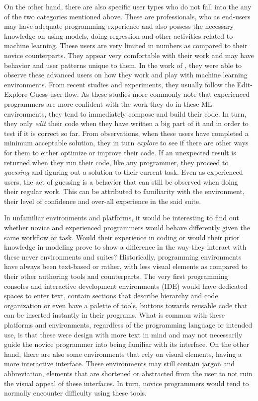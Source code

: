 \documentclass{sigchi}
\begin{document}
On the other hand, there are also specific user types who do not fall into the any of the two categories mentioned above. These are professionals, who as end-users may have adequate programming experience and also possess the necessary knowledge on using models, doing regression and other activities related to machine learning. These users are very limited in numbers as compared to their novice counterparts. They appear very comfortable with their work and may have behavior and user patterns unique to them. In the work of \cite{sarkar2015interactive}, they were able to observe these advanced users on how they work and play with machine learning environments. From recent studies and experiments, they usually follow the Edit-Explore-Guess user flow. As these studies more commonly note that experienced programmers are more confident with the work they do in these ML environments, they tend to immediately compose and build their code. In turn, they only \textit{edit} their code when they have written a big part of it and in order to test if it is correct so far. From observations, when these users have completed a minimum acceptable solution, they in turn \textit{explore} to see if there are other ways for them to either optimize or improve their code. If an unexpected result is returned when they run their code, like any programmer, they proceed to \textit{guessing} and figuring out a solution to their current task. Even as experienced users, the act of guessing is a behavior that can still be observed when doing their regular work. This can be attributed to familiarity with the environment, their level of confidence and over-all experience in the said suite. 

In unfamiliar environments and platforms, it would be interesting to find out whether novice and experienced programmers would behave differently given the same workflow or task. Would their experience in coding or would their prior knowledge in modeling prove to show a difference in the way they interact with these never environments and suites? Historically, programming environments have always been text-based or rather, with less visual elements as compared to their other authoring tools and counterparts. The very first programming consoles and interactive development environments (IDE) would have dedicated spaces to enter text, contain sections that describe hierarchy and code organization or even have a palette of tools, buttons towards reusable code that can be inserted instantly in their programs. What is common with these platforms and environments, regardless of the programming language or intended use, is that these were design with more text in mind and may not necessarily guide the novice programmer into being familiar with its interface. On the other hand, there are also some environments that rely on visual elements, having a more interactive interface. These environments may still contain jargon and abbreviation, elements that are shortened or abstracted from the user to not ruin the visual appeal of these interfaces. In turn, novice programmers would tend to normally encounter difficulty using these tools. 
\end{document}

